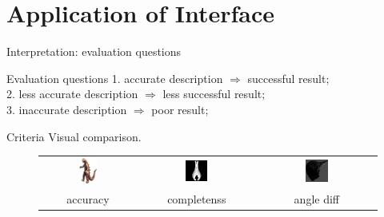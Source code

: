 \documentclass[10pt]{beamer}
\begin{document}
\section{Application of Interface}
\begin{frame}{Interpretation: evaluation questions}

\begin{exampleblock}{Evaluation questions}
  1. accurate description $\Rightarrow$ successful result; \\
  2. less accurate description $\Rightarrow$ less successful result;\\
  3. inaccurate description $\Rightarrow$ poor result; \\
\end{exampleblock}

\begin{exampleblock}{Criteria}
  Visual comparison.
\end{exampleblock}

\begin{figure}
\centering
\begin{tabular}{ccc}
\includegraphics[width=0.2\textwidth]{images/dino.png} &
\includegraphics[width=0.2\textwidth]{interp/synth_interp/vase0_sl} &
\includegraphics[width=0.2\textwidth]{interp/real_interp/vase/vase_spike} \\
accuracy & completenss & angle diff \\
\end{tabular}
\end{figure}

\end{frame}
\end{document}
